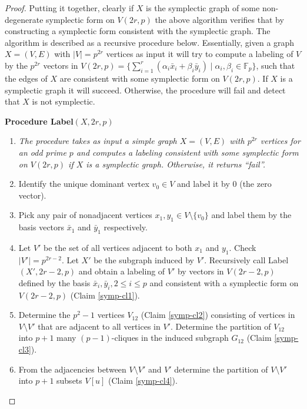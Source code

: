 \documentclass[10pt,a4paper]{amsart}
\newcommand{\F}{\mathbb{F}}
\begin{document}
\begin{proof}
Putting it together, clearly if $X$ is the symplectic graph of some
non-degenerate symplectic form on $V(2r,p)$ the above algorithm
verifies that by constructing a symplectic form consistent with the
symplectic graph. The algorithm is described as a recursive procedure
below. Essentially, given a graph $X=(V,E)$ with $|V|=p^{2r}$ vertices
as input it will try to compute a labeling of $V$ by the $p^{2r}$
vectors in
$V(2r,p)=\{\sum_{i=1}^r(\alpha_i\bar{x}_i+\beta_i\bar{y}_i)\mid
\alpha_i,\beta_i\in \F_p\}$, such that the edges of $X$ are consistent
with some symplectic form on $V(2r,p)$. If $X$ is a symplectic graph
it will succeed. Otherwise, the procedure will fail and detect that
$X$ is not symplectic.

\medbreak

\noindent\textbf{Procedure Label$(X,2r,p)$}
\begin{enumerate}
\item[] \emph{The procedure takes as input a simple graph $X=(V,E)$ with
$p^{2r}$ vertices for an odd prime $p$ and computes a
labeling consistent with some symplectic form on $V(2r,p)$ if
$X$ is a symplectic graph. Otherwise, it returns ``fail''.}

\item Identify the unique dominant vertex $v_0\in V$ and label it by
  $0$ (the zero vector).

\item Pick any pair of nonadjacent vertices $x_1, y_1\in V\setminus
  \{v_0\}$ and label them by the basis vectors $\bar{x}_1$ and
  $\bar{y}_1$ respectively.

\item Let $V'$ be the set of all vertices adjacent to both $x_1$ and
  $y_1$. Check $|V'|=p^{2r-2}$. Let $X'$ be the subgraph induced by
  $V'$. Recursively call Label$(X',2r-2,p)$ and obtain a labeling of
  $V'$ by vectors in $V(2r-2,p)$ defined by the basis
  $\bar{x}_i,\bar{y}_i, 2\le i\le p$ and consistent with a symplectic
  form on $V(2r-2,p)$ (Claim \ref{symp-cl1}).

\item Determine the $p^2-1$ vertices $V_{12}$ (Claim \ref{symp-cl2})
  consisting of vertices in $V\setminus V'$ that are adjacent to all
  vertices in $V'$. Determine the partition of $V_{12}$ into $p+1$
  many $(p-1)$-cliques in the induced subgraph $G_{12}$ (Claim
  \ref{symp-cl3}).

\item From the adjacencies between $V\setminus V'$ and $V'$ determine
  the partition of $V\setminus V'$ into $p+1$ subsets $V[u]$
  (Claim \ref{symp-cl4}).


\end{enumerate}
\end{proof}
\end{document}
